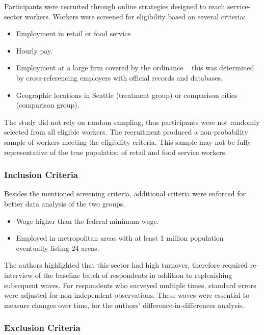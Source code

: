 \documentclass{article}
\begin{document}
	Participants were recruited through online strategies designed to reach service-sector workers. Workers were screened for eligibility based on several criteria:
	
	\begin{itemize}
		\item Employment in retail or food service
		\item Hourly pay.
		\item Employment at a large firm covered by the ordinance \textemdash~ this was determined by cross-referencing employers with official records and databases.
		\item Geographic locations in Seattle (treatment group) or comparison cities (comparison group).
	\end{itemize}
	
	The study did not rely on random sampling, thus participants were not randomly selected from all eligible workers. The recruitment produced a non-probability sample of workers meeting the eligibility criteria. This sample may not be fully representative of the true population of retail and food service workers.
	
	\subsubsection{Inclusion Criteria}
	
	Besides the mentioned screening criteria, additional criteria were enforced for better data analysis of the two groups.
	
	\begin{itemize}
		\item Wage higher than the federal minimum wage.
		\item Employed in metropolitan areas with at least 1 million population \textemdash~ eventually listing 24 areas.
	\end{itemize}
	
	The authors highlighted that this sector had high turnover, therefore required re-interview of the baseline batch of respondents in addition to replenishing subsequent waves. For respondents who surveyed multiple times, standard errors were adjusted for non-independent observations. These waves were essential to measure changes over time, for the authors' difference-in-differences analysis.
	
 	\subsubsection{Exclusion Criteria}
 	
\end{document}
